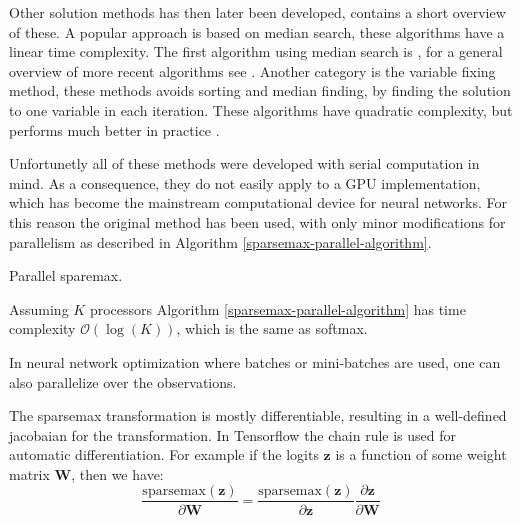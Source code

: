 Other solution methods has then later been developed, \cite{Liu2016} contains a short overview of these. A popular approach is based on median search, these algorithms have a linear time complexity. The first algorithm using median search is \cite{brucker1984a}, for a general overview of more recent algorithms see \cite{kiwiel2008a-median}. Another category is the variable fixing method, these methods avoids sorting and median finding, by finding the solution to one variable in each iteration. These algorithms have quadratic complexity, but performs much better in practice \cite{kiwiel2008a-fixing}.

Unfortunetly all of these methods were developed with serial computation in mind. As a consequence, they do not easily apply to a GPU implementation, which has become the mainstream computational device for neural networks. For this reason the original method \cite{Helgason1980} has been used, with only minor modifications for parallelism as described in Algorithm \ref{sparsemax-parallel-algorithm}.

\begin{algorithm}[H]
  \caption{Parallel sparemax.}
  \begin{algorithmic}[1]
       
       
       
      \State {}
    \EndFunction
  \end{algorithmic}
  \label{sparsemax-parallel-algorithm}
\end{algorithm}

Assuming $K$ processors Algorithm \ref{sparsemax-parallel-algorithm} has time complexity $\mathcal{O}(\log(K))$, which is the same as softmax.

In neural network optimization where batches or mini-batches are used, one can also parallelize over the observations.

The sparsemax transformation is mostly differentiable, resulting in a well-defined jacobaian for the transformation. In Tensorflow \cite{tensorflow2015-whitepaper} the chain rule is used for automatic differentiation. For example if the logits $\mathbf{z}$ is a function of some weight matrix $\mathbf{W}$, then we have:
\begin{equation}
\frac{\mathrm{sparsemax}(\mathbf{z})}{\partial \mathbf{W}} = \frac{\mathrm{sparsemax}(\mathbf{z})}{\partial \mathbf{z}} \frac{\partial \mathbf{z}}{\partial \mathbf{W}}
\end{equation}

